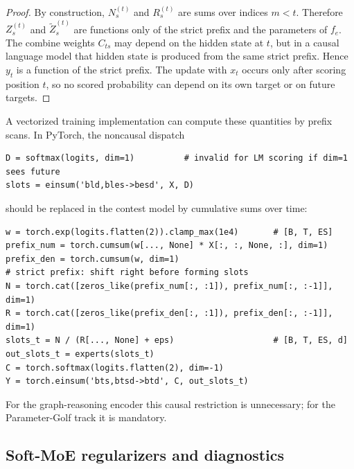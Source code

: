 \documentclass[11pt]{article}
\theoremstyle{definition}
\theoremstyle{plain}
\theoremstyle{remark}
\numberwithin{equation}{section}
\begin{document}
\begin{proof}
By construction, $N_s^{(t)}$ and $R_s^{(t)}$ are sums over indices $m<t$.  Therefore $Z_s^{(t)}$ and $\widetilde Z_s^{(t)}$ are functions only of the strict prefix and the parameters of $f_e$.  The combine weights $C_{t s}$ may depend on the hidden state at $t$, but in a causal language model that hidden state is produced from the same strict prefix.  Hence $y_t$ is a function of the strict prefix.  The update with $x_t$ occurs only after scoring position $t$, so no scored probability can depend on its own target or on future targets.
\end{proof}

A vectorized training implementation can compute these quantities by prefix scans.  In PyTorch, the noncausal dispatch
\begin{verbatim}
D = softmax(logits, dim=1)          # invalid for LM scoring if dim=1 sees future
slots = einsum('bld,bles->besd', X, D)
\end{verbatim}
should be replaced in the contest model by cumulative sums over time:
\begin{verbatim}
w = torch.exp(logits.flatten(2)).clamp_max(1e4)       # [B, T, ES]
prefix_num = torch.cumsum(w[..., None] * X[:, :, None, :], dim=1)
prefix_den = torch.cumsum(w, dim=1)
# strict prefix: shift right before forming slots
N = torch.cat([zeros_like(prefix_num[:, :1]), prefix_num[:, :-1]], dim=1)
R = torch.cat([zeros_like(prefix_den[:, :1]), prefix_den[:, :-1]], dim=1)
slots_t = N / (R[..., None] + eps)                    # [B, T, ES, d]
out_slots_t = experts(slots_t)
C = torch.softmax(logits.flatten(2), dim=-1)
Y = torch.einsum('bts,btsd->btd', C, out_slots_t)
\end{verbatim}
For the graph-reasoning encoder this causal restriction is unnecessary; for the Parameter-Golf track it is mandatory.

\subsection{Soft-MoE regularizers and diagnostics}
\end{document}
